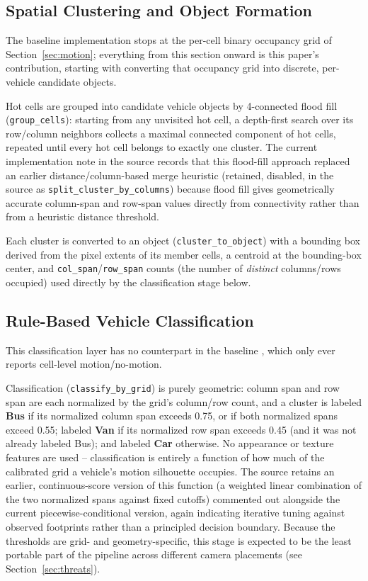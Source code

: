 \documentclass[conference]{IEEEtran}
\newcommand{\code}[1]{\texttt{#1}}
\begin{document}
\subsection{Spatial Clustering and Object Formation}
\label{sec:cluster}

The baseline implementation \cite{baseline} stops at the per-cell binary
occupancy grid of Section~\ref{sec:motion}; everything from this section
onward is this paper's contribution, starting with converting that
occupancy grid into discrete, per-vehicle candidate objects.

Hot cells are grouped into candidate vehicle objects by 4-connected
flood fill (\code{group\_cells}): starting from any unvisited hot cell,
a depth-first search over its row/column neighbors collects a maximal
connected component of hot cells, repeated until every hot cell belongs
to exactly one cluster. The current implementation note in the source
records that this flood-fill approach replaced an earlier
distance/column-based merge heuristic (retained, disabled, in the
source as \code{split\_cluster\_by\_columns}) because flood fill gives
geometrically accurate column-span and row-span values directly from
connectivity rather than from a heuristic distance threshold.

Each cluster is converted to an object (\code{cluster\_to\_object}) with
a bounding box derived from the pixel extents of its member cells, a
centroid at the bounding-box center, and \code{col\_span}/\code{row\_span}
counts (the number of \emph{distinct} columns/rows occupied) used
directly by the classification stage below.

\subsection{Rule-Based Vehicle Classification}
\label{sec:classify}

This classification layer has no counterpart in the baseline
\cite{baseline}, which only ever reports cell-level motion/no-motion.

Classification (\code{classify\_by\_grid}) is purely geometric: column
span and row span are each normalized by the grid's column/row count,
and a cluster is labeled \textbf{Bus} if its normalized column span
exceeds 0.75, or if both normalized spans exceed 0.55; labeled
\textbf{Van} if its normalized row span exceeds 0.45 (and it was not
already labeled Bus); and labeled \textbf{Car} otherwise. No appearance
or texture features are used -- classification is entirely a function
of how much of the calibrated grid a vehicle's motion silhouette
occupies. The source retains an earlier, continuous-score version of
this function (a weighted linear combination of the two normalized
spans against fixed cutoffs) commented out alongside the current
piecewise-conditional version, again indicating iterative tuning
against observed footprints rather than a principled decision boundary.
Because the thresholds are grid- and geometry-specific, this stage is
expected to be the least portable part of the pipeline across different
camera placements (see Section~\ref{sec:threats}).
\end{document}
